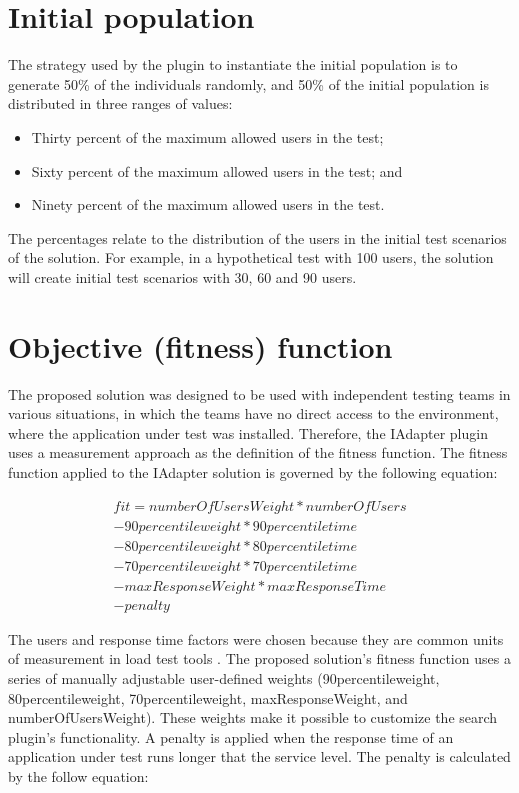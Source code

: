 \documentclass{report}
\begin{document}
\section{Initial population}

The strategy used by the plugin to instantiate the initial population is to generate 50\% of the individuals randomly, and 50\% of the initial population is distributed in three ranges of values:

\begin{itemize}
\item Thirty percent of the maximum allowed users in the test;
\item Sixty percent of the maximum allowed users in the test; and
\item Ninety percent of the maximum allowed users in the test.
\end{itemize}

The percentages relate to the distribution of the users in the initial test scenarios of the solution. For example, in a hypothetical test with 100 users, the solution will create initial test scenarios with 30, 60 and 90 users.

\section{Objective (fitness) function}

The proposed solution was designed to be used with independent testing teams in various situations, in which the teams have no direct access to the environment, where the application under test was installed. Therefore, the IAdapter plugin uses a measurement approach as the definition of the fitness function. The fitness function applied to the IAdapter solution is governed by the following equation:

\begin{equation}
\begin{aligned}
fit=numberOfUsersWeight*numberOfUsers\\
-90percentileweight* 90percentiletime\\
-80percentileweight*80percentiletime\\
-70percentileweight*70percentiletime\\
-maxResponseWeight*maxResponseTime\\
-penalty
\end{aligned}
\end{equation}

The users and response time factors were chosen because they are common units of measurement in load test tools \cite{Sandler2004}. The proposed solution's fitness function uses a series of manually adjustable user-defined weights (90percentileweight, 80percentileweight,  70percentileweight, maxResponseWeight, and numberOfUsersWeight). These weights make it possible to customize the search plugin's functionality. A penalty is applied when the response time of an application under test runs longer that the service level. The penalty is calculated by the follow equation:
\end{document}
